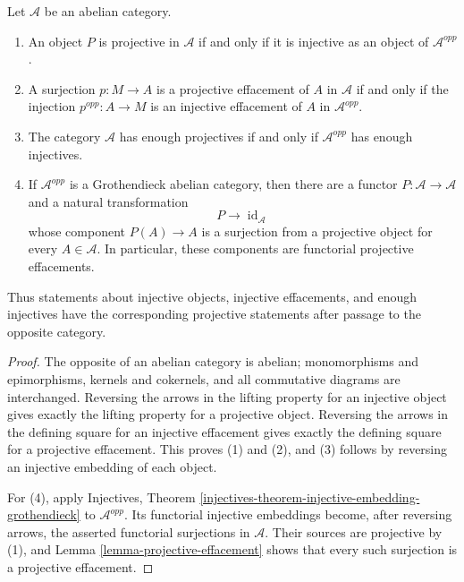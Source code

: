 \begin{lemma}
\label{lemma-projective-effacement-opposite-category}
\begin{reference}
\cite[Chapter I, \S 1.10, Remark 4, p. 137]{Tohoku}
\end{reference}
Let $\mathcal A$ be an abelian category.
\begin{enumerate}
\item An object $P$ is projective in $\mathcal A$ if and only if it is
injective as an object of $\mathcal A^{opp}$.
\item A surjection $p:M\to A$ is a projective effacement of $A$ in
$\mathcal A$ if and only if the injection $p^{opp}:A\to M$ is an injective
effacement of $A$ in $\mathcal A^{opp}$.
\item The category $\mathcal A$ has enough projectives if and only if
$\mathcal A^{opp}$ has enough injectives.
\item If $\mathcal A^{opp}$ is a Grothendieck abelian category, then there
are a functor $P:\mathcal A\to\mathcal A$ and a natural transformation
\[
P\longrightarrow\operatorname{id}_{\mathcal A}
\]
whose component $P(A)\to A$ is a surjection from a projective object for
every $A\in\mathcal A$. In particular, these components are functorial
projective effacements.
\end{enumerate}
Thus statements about injective objects, injective effacements, and enough
injectives have the corresponding projective statements after passage to
the opposite category.
\end{lemma}

\begin{proof}
The opposite of an abelian category is abelian; monomorphisms and
epimorphisms, kernels and cokernels, and all commutative diagrams are
interchanged. Reversing the arrows in the lifting property for an injective
object gives exactly the lifting property for a projective object. Reversing
the arrows in the defining square for an injective effacement gives exactly
the defining square for a projective effacement. This proves (1) and (2),
and (3) follows by reversing an injective embedding of each object.

For (4), apply Injectives, Theorem
\ref{injectives-theorem-injective-embedding-grothendieck} to
$\mathcal A^{opp}$. Its functorial injective embeddings become, after
reversing arrows, the asserted functorial surjections in $\mathcal A$.
Their sources are projective by (1), and Lemma
\ref{lemma-projective-effacement} shows that every such surjection
is a projective effacement.
\end{proof}
